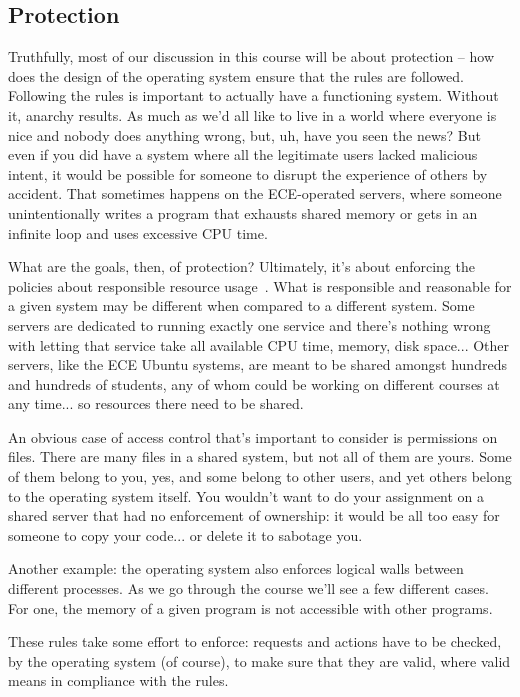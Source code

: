 \subsection*{Protection}
Truthfully, most of our discussion in this course will be about protection -- how does the design of the operating system ensure that the rules are followed. Following the rules is important to actually have a functioning system. Without it, anarchy results. As much as we'd all like to live in a world where everyone is nice and nobody does anything wrong, but, uh, have you seen the news? But even if you did have a system where all the legitimate users lacked malicious intent, it would be possible for someone to disrupt the experience of others by accident. That sometimes happens on the ECE-operated servers, where someone unintentionally writes a program that exhausts shared memory or gets in an infinite loop and uses excessive CPU time.

What are the goals, then, of protection? Ultimately, it's about enforcing the policies about responsible resource usage~\cite{osc}. What is responsible and reasonable for a given system may be different when compared to a different system. Some servers are dedicated to running exactly one service and there's nothing wrong with letting that service take all available CPU time, memory, disk space... Other servers, like the ECE Ubuntu systems, are meant to be shared amongst hundreds and hundreds of students, any of whom could be working on different courses at any time... so resources there need to be shared. 

An obvious case of access control that's important to consider is permissions on files. There are many files in a shared system, but not all of them are yours. Some of them belong to you, yes, and some belong to other users, and yet others belong to the operating system itself. You wouldn't want to do your assignment on a shared server that had no enforcement of ownership: it would be all too easy for someone to copy your code... or delete it to sabotage you. 

Another example: the operating system also enforces logical walls between different processes. As we go through the course we'll see a few different cases. For one, the memory of a given program is not accessible with other programs.

These rules take some effort to enforce: requests and actions have to be checked, by the operating system (of course), to make sure that they are valid, where valid means in compliance with the rules.

